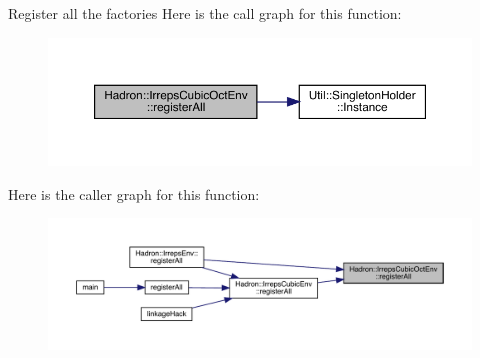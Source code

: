 Register all the factories Here is the call graph for this function\+:\nopagebreak
\begin{figure}[H]
\begin{center}
\leavevmode
\includegraphics[width=350pt]{db/d79/namespaceHadron_1_1IrrepsCubicOctEnv_add350f077e8bf956336f99fe5dc1c29d_cgraph}
\end{center}
\end{figure}
Here is the caller graph for this function\+:
\nopagebreak
\begin{figure}[H]
\begin{center}
\leavevmode
\includegraphics[width=350pt]{db/d79/namespaceHadron_1_1IrrepsCubicOctEnv_add350f077e8bf956336f99fe5dc1c29d_icgraph}
\end{center}
\end{figure}
